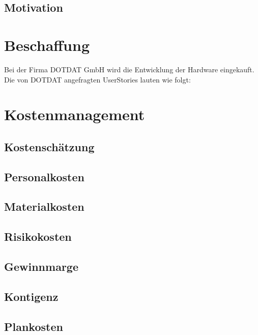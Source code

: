 \subsection{Motivation} %



\section{Beschaffung} %
Bei der Firma DOTDAT GmbH wird die Entwicklung der Hardware eingekauft. Die von DOTDAT angefragten UserStories lauten wie folgt:





% 




\section{Kostenmanagement}



\subsection{Kostenschätzung}
\lipsum[2]
\subsection{Personalkosten} %
\lipsum[2]
\subsection{Materialkosten}
\lipsum[2]
\subsection{Risikokosten}
\lipsum[2]
\subsection{Gewinnmarge}
\lipsum[2]
\subsection{Kontigenz} %
\lipsum[2]
\subsection{Plankosten}
\lipsum[2]





